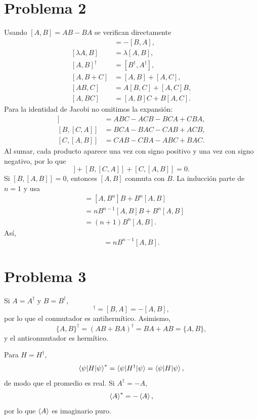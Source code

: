 \documentclass[11pt,a4paper]{article}
\numberwithin{equation}{section}
\renewcommand{\boxed}[1]{#1}
\begin{document}
\section{Problema 2}
Usando $[A,B]=AB-BA$ se verifican directamente
\begin{align}
[A,B]&=-[B,A],\\
[\lambda A,B]&=\lambda[A,B],\\
[A,B]^\dagger&=[B^\dagger,A^\dagger],\\
[A,B+C]&=[A,B]+[A,C],\\
[AB,C]&=A[B,C]+[A,C]B,\\
[A,BC]&=[A,B]C+B[A,C].
\end{align}
Para la identidad de Jacobi no omitimos la expansión:
\begin{align}
[A,[B,C]]&=ABC-ACB-BCA+CBA,\\
[B,[C,A]]&=BCA-BAC-CAB+ACB,\\
[C,[A,B]]&=CAB-CBA-ABC+BAC.
\end{align}
Al sumar, cada producto aparece una vez con signo positivo y una vez con signo negativo, por lo que
\begin{equation}
[A,[B,C]]+[B,[C,A]]+[C,[A,B]]=0.
\end{equation}
Si $[B,[A,B]]=0$, entonces $[A,B]$ conmuta con $B$. La inducción parte de $n=1$ y usa
\begin{align}
[A,B^{n+1}]&=[A,B^n]B+B^n[A,B]\\
&=nB^{n-1}[A,B]B+B^n[A,B]\\
&=(n+1)B^n[A,B].
\end{align}
Así,
\begin{equation}
\boxed{[A,B^n]=nB^{n-1}[A,B].}
\end{equation}

\section{Problema 3}
Si $A=A^\dagger$ y $B=B^\dagger$,
\begin{equation}
[A,B]^\dagger=[B,A]=-[A,B],
\end{equation}
por lo que el conmutador es antihermítico. Asimismo,
\begin{equation}
\{A,B\}^\dagger=(AB+BA)^\dagger=BA+AB=\{A,B\},
\end{equation}
y el anticonmutador es hermítico.

Para $H=H^\dagger$,
\begin{equation}
\braket{\psi|H|\psi}^*=\braket{\psi|H^\dagger|\psi}=\braket{\psi|H|\psi},
\end{equation}
de modo que el promedio es real. Si $A^\dagger=-A$,
\begin{equation}
\braket{A}^*=-\braket A,
\end{equation}
por lo que $\braket A$ es imaginario puro.
\end{document}

